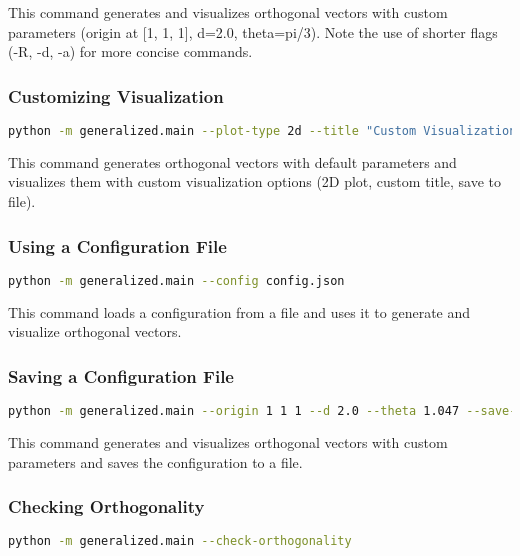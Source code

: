 This command generates and visualizes orthogonal vectors with custom parameters (origin at [1, 1, 1], d=2.0, theta=pi/3). Note the use of shorter flags (-R, -d, -a) for more concise commands.

\subsubsection{Customizing Visualization}

\begin{lstlisting}[language=bash]
python -m generalized.main --plot-type 2d --title "Custom Visualization" --save-path custom.png
\end{lstlisting}

This command generates orthogonal vectors with default parameters and visualizes them with custom visualization options (2D plot, custom title, save to file).

\subsubsection{Using a Configuration File}

\begin{lstlisting}[language=bash]
python -m generalized.main --config config.json
\end{lstlisting}

This command loads a configuration from a file and uses it to generate and visualize orthogonal vectors.

\subsubsection{Saving a Configuration File}

\begin{lstlisting}[language=bash]
python -m generalized.main --origin 1 1 1 --d 2.0 --theta 1.047 --save-config config.json
\end{lstlisting}

This command generates and visualizes orthogonal vectors with custom parameters and saves the configuration to a file.

\subsubsection{Checking Orthogonality}

\begin{lstlisting}[language=bash]
python -m generalized.main --check-orthogonality
\end{lstlisting}

